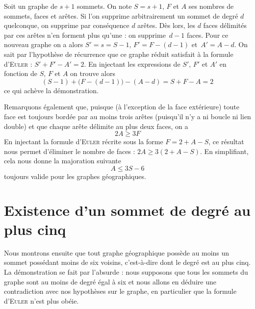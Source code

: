 \documentclass[french]{report}
\begin{document}
Soit un graphe de $s+1$ sommets. On note $S=s+1$, $F$ et $A$ ses nombres de sommets, faces et arêtes. Si l'on supprime arbitrairement un sommet de degré $d$ quelconque, on supprime par conséquence $d$ arêtes. Dès lors, les $d$ faces délimités par ces arêtes n'en forment plus qu'une : on supprime~$d-1$ faces. Pour ce nouveau graphe on a alors $S'=s=S-1$, $F'=F-(d-1)$ et~$A'=A-d$. On sait par l'hypothèse de récurrence que ce graphe réduit satisfait à la formule d'\textsc{Euler} : $S'+F'-A'=2$. En injectant les expressions de $S'$, $F'$ et $A'$ en fonction de $S$, $F$ et $A$ on trouve alors $$(S-1)+\big(F-(d-1)\big)-(A-d)=S+F-A=2$$ ce qui achève la démonstration.\bigskip

Remarquons également que, puisque (à l'exception de la face extérieure) toute face est toujours bordée par au moins trois arêtes (puisqu'il n'y a ni boucle ni lien double) et que chaque arête délimite au plus deux faces, on a $$2A\geqslant 3F$$
%
%
En injectant la formule d'\textsc{Euler} récrite sous la forme $F=2+A-S$, ce résultat nous permet d'éliminer le nombre de faces : $2A\geqslant 3(2+A-S)$. En simplifiant, cela nous donne la majoration suivante $$A\leqslant 3S-6$$ toujours valide pour les graphes géographiques.\\

\section{Existence d'un sommet de degré au plus cinq}\label{Existence}

Nous montrons ensuite que tout graphe géographique possède au moins un sommet possédant moins de six voisins, c'est-à-dire dont le degré est au plus cinq. La démonstration se fait par l'absurde : nous supposons que tous les sommets du graphe sont au moins de degré égal à six et nous allons en déduire une contradiction avec nos hypothèses sur le graphe, en particulier que la formule d'\textsc{Euler} n'est plus obéie.

\end{document}
